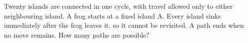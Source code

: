 Twenty islands are connected in one cycle, with travel allowed only to either neighbouring island. A frog starts at a fixed island A. Every island sinks immediately after the frog leaves it, so it cannot be revisited. A path ends when no move remains. How many paths are possible?
